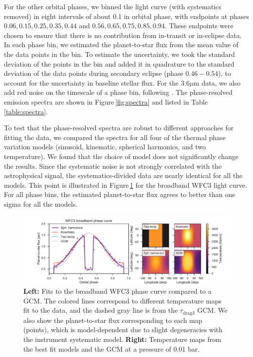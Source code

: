 \documentclass[twocolumn]{aastex61}
\begin{document}
For the other orbital phases, we binned the light curve (with systematics removed) in eight intervals of about 0.1 in orbital phase, with endpoints at phases $0.06, 0.15, 0.25, 0.35, 0.44$ and $0.56, 0.65, 0.75, 0.85, 0.94$. These endpoints were chosen to ensure that there is no contribution from in-transit or in-eclipse data.  In each phase bin, we estimated the planet-to-star flux from the mean value of the data points in the bin. To estimate the uncertainty, we took the standard deviation of the points in the bin and added it in quadrature to the standard deviation of the data points during secondary eclipse (phase $0.46-0.54$), to account for the uncertainty in baseline stellar flux.  For the $3.6\mu$m data, we also add red noise on the timescale of a phase bin, following \cite{pont06}.  The phase-resolved emission spectra are shown in Figure\,\ref{fig:spectra} and listed in Table\,\ref{table:spectra}. 

To test that the phase-resolved spectra are robust to different approaches for fitting the data, we compared the spectra for all four of the thermal phase variation models (sinusoid, kinematic, spherical harmonics, and two temperature). We found that the choice of model does not significantly change the results.  Since the systematic noise is not strongly correlated with the astrophysical signal, the systematics-divided data are nearly identical for all the models.  This point is illustrated in Figure\,\ref{fig:model_comparison} for the broadband WFC3 light curve. For all phase bins, the estimated planet-to-star flux agrees to better than one sigma for all the models.

\begin{figure}
\includegraphics[width = 1.0\textwidth]{Figures/hst_model_comparison.pdf}
\caption{\textbf{Left:} Fits to the broadband WFC3 phase curve compared to a GCM. The colored lines correspond to different temperature maps fit to the data, and the dashed gray line is from the $\tau_\mathrm{drag3}$ GCM. We also show the planet-to-star flux corresponding to each map (points), which is model-dependent due to slight degeneracies with the instrument systematic model.  \textbf{Right:} Temperature maps from the best fit models and the GCM at a pressure of 0.01 bar.}
\label{fig:model_comparison}
\end{figure}
\end{document}
